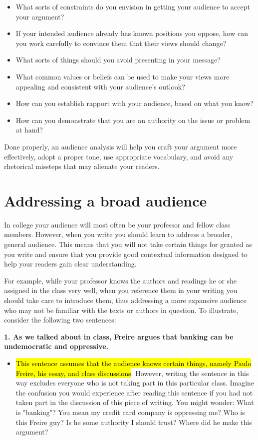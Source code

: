 \begin{itemize}

\item What sorts of constraints do you envision in getting your audience to accept your
argument? 
\item If your intended audience already has known positions you
oppose, how can you work carefully to convince them that their views should
change? 
\item What sorts of things should you avoid presenting in your message?
\item What common values or beliefs can be used to make your views more
appealing and consistent with your audience's outlook? 
\item How can you establish rapport with your audience, based on what you know? 
\item How can you demonstrate that you are an authority on the issue or problem at hand?

\end{itemize}

\noindent Done properly, an audience analysis will help you craft your argument
more effectively, adopt a proper tone, use appropriate vocabulary, and avoid
any rhetorical missteps that may alienate your readers.

 \section{Addressing a broad audience}

In college your audience will most often be your professor and fellow class
members. However, when you write you should learn to address a broader, general audience.
This means that you will not take certain things for granted as you write and ensure
that you provide good contextual information designed to help your readers gain clear understanding. 

For example, while your professor knows the authors and readings he or she assigned in the class
very well, when you reference them in your writing you should take care to
introduce them, thus addressing a more expansive audience who may not
be familiar with the texts or authors in question. To illustrate, consider the following two
sentences:

\newpage

\textbf{1. As we talked about in class, Freire argues that banking can be undemocratic and oppressive.}

\begin{itemize} \item \hl{This sentence assumes that the audience knows
certain things, namely Paulo Freire, his essay, and class discussions}. However,
writing the sentence in this way excludes everyone who is not taking part in
this particular class. Imagine the confusion you would experience after reading
this sentence if you had not taken part in the discussion of this piece of
writing. You might wonder: What is "banking"? You mean my credit card company is oppressing me? Who is this Freire guy? Is he some authority I should trust? Where did he make this argument?
\end{itemize}

